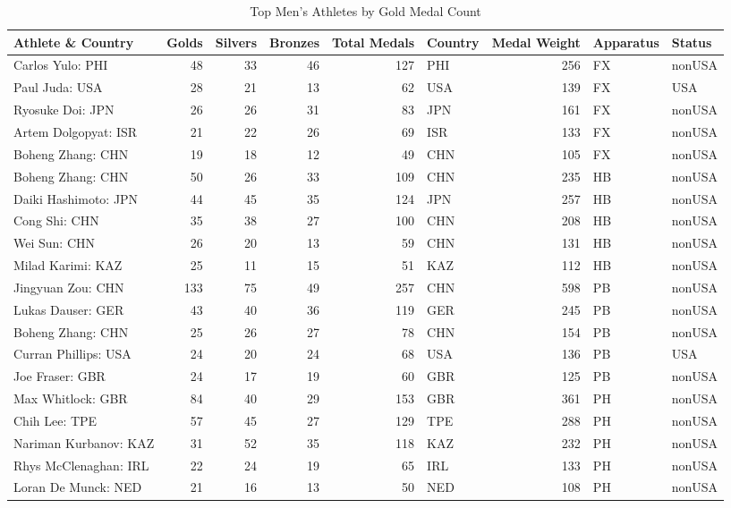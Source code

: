 \documentclass[
  10.5pt,
  letterpaper,
  DIV=11,
  numbers=noendperiod]{scrartcl}
\begin{document}
\begin{table}[H]

\caption{Top Men's Athletes by Gold Medal Count}
\centering
\fontsize{8}{10}\selectfont
\begin{tabular}[t]{l|r|r|r|r|l|r|l|l}
\hline
Athlete \& Country & Golds & Silvers & Bronzes & Total Medals & Country & Medal Weight & Apparatus & Status\\
\hline
Carlos Yulo: PHI & 48 & 33 & 46 & 127 & PHI & 256 & FX & nonUSA\\
\hline
Paul Juda: USA & 28 & 21 & 13 & 62 & USA & 139 & FX & USA\\
\hline
Ryosuke Doi: JPN & 26 & 26 & 31 & 83 & JPN & 161 & FX & nonUSA\\
\hline
Artem Dolgopyat: ISR & 21 & 22 & 26 & 69 & ISR & 133 & FX & nonUSA\\
\hline
Boheng Zhang: CHN & 19 & 18 & 12 & 49 & CHN & 105 & FX & nonUSA\\
\hline
Boheng Zhang: CHN & 50 & 26 & 33 & 109 & CHN & 235 & HB & nonUSA\\
\hline
Daiki Hashimoto: JPN & 44 & 45 & 35 & 124 & JPN & 257 & HB & nonUSA\\
\hline
Cong Shi: CHN & 35 & 38 & 27 & 100 & CHN & 208 & HB & nonUSA\\
\hline
Wei Sun: CHN & 26 & 20 & 13 & 59 & CHN & 131 & HB & nonUSA\\
\hline
Milad Karimi: KAZ & 25 & 11 & 15 & 51 & KAZ & 112 & HB & nonUSA\\
\hline
Jingyuan Zou: CHN & 133 & 75 & 49 & 257 & CHN & 598 & PB & nonUSA\\
\hline
Lukas Dauser: GER & 43 & 40 & 36 & 119 & GER & 245 & PB & nonUSA\\
\hline
Boheng Zhang: CHN & 25 & 26 & 27 & 78 & CHN & 154 & PB & nonUSA\\
\hline
Curran Phillips: USA & 24 & 20 & 24 & 68 & USA & 136 & PB & USA\\
\hline
Joe Fraser: GBR & 24 & 17 & 19 & 60 & GBR & 125 & PB & nonUSA\\
\hline
Max Whitlock: GBR & 84 & 40 & 29 & 153 & GBR & 361 & PH & nonUSA\\
\hline
Chih Lee: TPE & 57 & 45 & 27 & 129 & TPE & 288 & PH & nonUSA\\
\hline
Nariman Kurbanov: KAZ & 31 & 52 & 35 & 118 & KAZ & 232 & PH & nonUSA\\
\hline
Rhys McClenaghan: IRL & 22 & 24 & 19 & 65 & IRL & 133 & PH & nonUSA\\
\hline
Loran De Munck: NED & 21 & 16 & 13 & 50 & NED & 108 & PH & nonUSA\\

\end{tabular}
\end{table}
\end{document}

